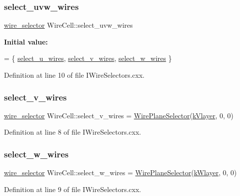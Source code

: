 \subsubsection{\texorpdfstring{select\+\_\+uvw\+\_\+wires}{select\_uvw\_wires}}
{\footnotesize\ttfamily \hyperlink{namespace_wire_cell_a9d7058ef4d388953ee9d03ff51509e51}{wire\+\_\+selector} Wire\+Cell\+::select\+\_\+uvw\+\_\+wires}

{\bfseries Initial value\+:}
\begin{DoxyCode}
= \{
    \hyperlink{namespace_wire_cell_a7282c5ddd00793097ad33fae7f82c6a5}{select\_u\_wires},
    \hyperlink{namespace_wire_cell_a95f0ccbdb40e382cf391a7ee25ca3bd1}{select\_v\_wires},
    \hyperlink{namespace_wire_cell_a543ea6901b1d80a4dc43c7bdef156d77}{select\_w\_wires}
    \}
\end{DoxyCode}


Definition at line 10 of file I\+Wire\+Selectors.\+cxx.

\mbox{\label{namespace_wire_cell_a95f0ccbdb40e382cf391a7ee25ca3bd1}} 
\subsubsection{\texorpdfstring{select\+\_\+v\+\_\+wires}{select\_v\_wires}}
{\footnotesize\ttfamily \hyperlink{namespace_wire_cell_a9d7058ef4d388953ee9d03ff51509e51}{wire\+\_\+selector} Wire\+Cell\+::select\+\_\+v\+\_\+wires = \hyperlink{struct_wire_cell_1_1_wire_plane_selector}{Wire\+Plane\+Selector}(\hyperlink{namespace_wire_cell_a761397ff086f0a7e1a1d9ccd251ac618ad767a06a96af29d2fd31cbf13f4a1c86}{k\+Vlayer}, 0, 0)}



Definition at line 8 of file I\+Wire\+Selectors.\+cxx.

\mbox{\label{namespace_wire_cell_a543ea6901b1d80a4dc43c7bdef156d77}} 
\subsubsection{\texorpdfstring{select\+\_\+w\+\_\+wires}{select\_w\_wires}}
{\footnotesize\ttfamily \hyperlink{namespace_wire_cell_a9d7058ef4d388953ee9d03ff51509e51}{wire\+\_\+selector} Wire\+Cell\+::select\+\_\+w\+\_\+wires = \hyperlink{struct_wire_cell_1_1_wire_plane_selector}{Wire\+Plane\+Selector}(\hyperlink{namespace_wire_cell_a761397ff086f0a7e1a1d9ccd251ac618ac96acb93802a30ef1648ee1c0e81eab1}{k\+Wlayer}, 0, 0)}



Definition at line 9 of file I\+Wire\+Selectors.\+cxx.

